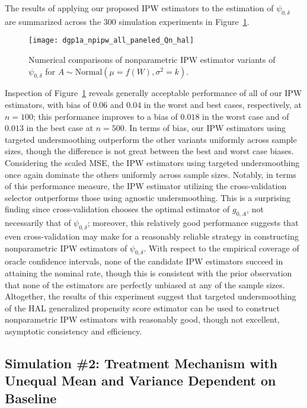 The results of applying our proposed IPW estimators to the estimation of
$\psi_{0,\delta}$ are summarized across the $300$ simulation experiments in
Figure~\ref{fig:dgp1a_npipw}.
\begin{figure}[H]
  \centering
  \texttt{[image: dgp1a\_npipw\_all\_paneled\_Qn\_hal]}
  \caption{Numerical comparisons of nonparametric IPW estimator variants of
     $\psi_{0,\delta}$ for $A \sim \text{Normal}(\mu = f(W), \sigma^2 = k)$.}
  \label{fig:dgp1a_npipw}
\end{figure}
Inspection of Figure~\ref{fig:dgp1a_npipw} reveals generally acceptable
performance of all of our IPW estimators, with bias of $0.06$ and $0.04$ in the
worst and best cases, respectively, at $n=100$; this performance improves to a
bias of $0.018$ in the worst case and of $0.013$ in the best case at $n=500$. In
terms of bias, our IPW estimators using targeted undersmoothing outperform the
other variants uniformly across sample sizes, though the difference is not great
between the best and worst case biases. Considering the scaled MSE, the IPW
estimators using targeted undersmoothing once again dominate the others
uniformly across sample sizes. Notably, in terms of this performance measure,
the IPW estimator utilizing the cross-validation selector outperforms those
using agnostic undersmoothing. This is a surprising finding since
cross-validation chooses the optimal estimator of $g_{0,A}$, not necessarily
that of $\psi_{0,\delta}$; moreover, this relatively good performance suggests
that even cross-validation may make for a reasonably reliable strategy in
constructing nonparametric IPW estimators of $\psi_{0,\delta}$. With respect to
the empirical coverage of oracle confidence intervals, none of the candidate
IPW estimators succeed in attaining the nominal rate, though this is consistent
with the prior observation that none of the estimators are perfectly unbiased at
any of the sample sizes. Altogether, the results of this experiment suggest that
targeted undersmoothing of the HAL generalized propensity score estimator can be
used to construct nonparametric IPW estimators with reasonably good, though not
excellent, asymptotic consistency and efficiency.

\subsection{Simulation \#2: Treatment Mechanism with Unequal Mean and Variance
Dependent on Baseline}\label{hese_sim_norm}

